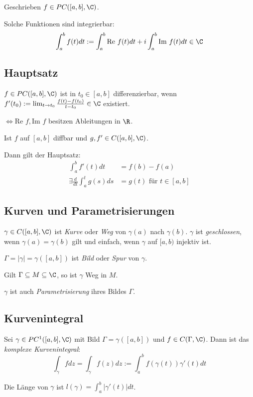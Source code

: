 Geschrieben \(f \in PC([a,b],\C)\).

Solche Funktionen sind integrierbar:
\[ \int_a^b f(t) dt := \int_a^b \text{Re } f(t) dt + i \int_a^b \text{Im } f(t) dt \in \C \]

\subsection*{Hauptsatz}

\(f \in PC([a,b],\C)\) ist in \(t_0 \in [a,b]\) differenzierbar, wenn \(f'(t_0) := \lim_{t \to t_0} \frac{f(t)-f(t_0)}{t-t_0} \in \C\) existiert.

\(\iff \text{Re } f, \text{Im } f\) besitzen Ableitungen in \(\R\).

Ist \(f\) auf \([a,b]\) diffbar und \(g, f' \in C([a,b],\C)\).

Dann gilt der Hauptsatz:
\begin{align*}
\int_a^b f'(t) dt &= f(b) - f(a) \\
\exists \frac{d}{dt} \int_a^t g(s) ds &= g(t) \text{ für } t \in [a,b]
\end{align*}

\subsection*{Kurven und Parametrisierungen}

\(\gamma \in C([a,b],\C)\) ist \emph{Kurve} oder \emph{Weg} von \(\gamma(a)\) nach \(\gamma(b)\). \(\gamma\) ist \emph{geschlossen}, wenn \(\gamma(a)=\gamma(b)\) gilt und einfach, wenn \(\gamma\) auf \([a,b)\) injektiv ist.

\(\Gamma = |\gamma| = \gamma([a,b])\) ist \emph{Bild} oder \emph{Spur} von \(\gamma\).

Gilt \(\Gamma \subseteq M \subseteq \C\), so ist \(\gamma\) Weg in \(M\).

\(\gamma\) ist auch \emph{Parametrisierung} ihres Bildes \(\Gamma\).

\subsection*{Kurvenintegral}

Sei \(\gamma \in PC^1([a,b],\C)\) mit Bild \(\Gamma = \gamma([a,b])\) und \(f \in C(\Gamma,\C)\). Dann ist das \emph{komplexe Kurvenintegral}:
\[ \int_\gamma f dz = \int_\gamma f(z) dz := \int_a^b f(\gamma(t))\gamma'(t) dt \]

Die Länge von \(\gamma\) ist \(l(\gamma) = \int_a^b |\gamma'(t)| dt\).

